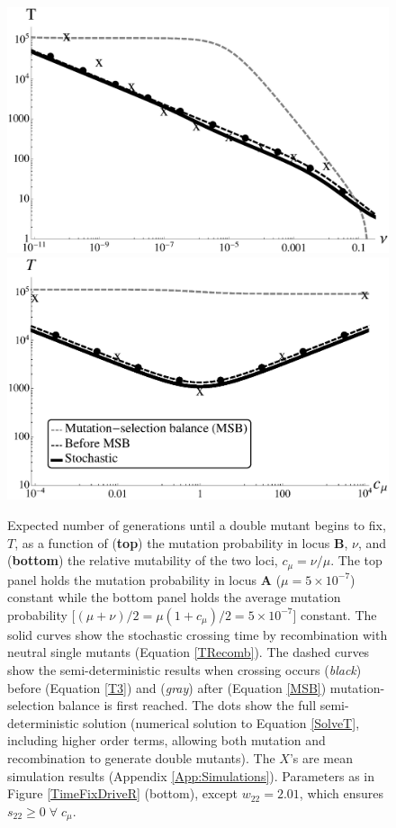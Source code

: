 \documentclass[review,3p,authoryear]{elsarticle}
\begin{document}
\begin{figure}[t]
\centering
\includegraphics[width=0.75\linewidth]{IMAGES/TimeFixUniLogNuSimsBW.eps}
\includegraphics[width=0.75\linewidth]{IMAGES/TimeFixUniLogU2SimsBW.eps}
\caption{
Expected number of generations until a double mutant begins to fix, $T$, as a function of (\textbf{top}) the mutation probability in locus $\mathbf{B}$, $\nu$, and (\textbf{bottom}) the relative mutability of the two loci, $c_\mu=\nu/\mu$.
The top panel holds the mutation probability in locus $\mathbf{A}$ ($\mu=5\times 10^{-7}$) constant while the bottom panel holds the average mutation probability [$(\mu+\nu)/2=\mu(1+c_\mu)/2 = 5\times10^{-7}$] constant.
The solid curves show the stochastic crossing time by recombination with neutral single mutants (Equation \ref{TRecomb}).
The dashed curves show the semi-deterministic results when crossing occurs (\textit{black}) before (Equation \ref{T3}) and (\textit{gray}) after (Equation \ref{MSB}) mutation-selection balance is first reached.
The dots show the full semi-deterministic solution (numerical solution to Equation \ref{SolveT}, including higher order terms, allowing both mutation and recombination to generate double mutants).
The $X$'s are mean simulation results (Appendix \ref{App:Simulations}).
Parameters as in Figure \ref{TimeFixDriveR} (bottom), except $w_{22}=2.01$, which ensures $s_{22}\geq0\;\forall \; c_\mu$.
}
\label{TimeFixUni}
\end{figure}
\end{document}
